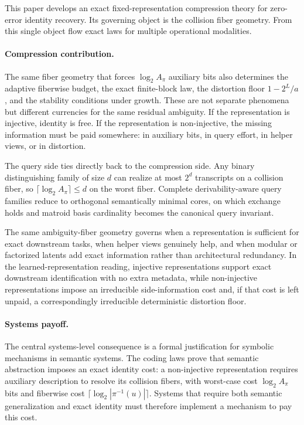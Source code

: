 This paper develops an exact fixed-representation compression theory for zero-error identity recovery. Its governing object is the collision fiber geometry. From this single object flow exact laws for multiple operational modalities.

\paragraph{Compression contribution.}
The same fiber geometry that forces $\log_2 A_\pi$ auxiliary bits also determines the adaptive fiberwise budget, the exact finite-block law, the distortion floor $1-2^L/a$, and the stability conditions under growth. These are not separate phenomena but different currencies for the same residual ambiguity. If the representation is injective, identity is free. If the representation is non-injective, the missing information must be paid somewhere: in auxiliary bits, in query effort, in helper views, or in distortion.

The query side ties directly back to the compression side. Any binary distinguishing family of size $d$ can realize at most $2^d$ transcripts on a collision fiber, so $\lceil \log_2 A_\pi \rceil \le d$ on the worst fiber. Complete derivability-aware query families reduce to orthogonal semantically minimal cores, on which exchange holds and matroid basis cardinality becomes the canonical query invariant.

The same ambiguity-fiber geometry governs when a representation is sufficient for exact downstream tasks, when helper views genuinely help, and when modular or factorized latents add exact information rather than architectural redundancy. In the learned-representation reading, injective representations support exact downstream identification with no extra metadata, while non-injective representations impose an irreducible side-information cost and, if that cost is left unpaid, a correspondingly irreducible deterministic distortion floor.

\paragraph{Systems payoff.}
The central systems-level consequence is a formal justification for symbolic mechanisms in semantic systems. The coding laws prove that semantic abstraction imposes an exact identity cost: a non-injective representation requires auxiliary description to resolve its collision fibers, with worst-case cost $\log_2 A_\pi$ bits and fiberwise cost $\lceil \log_2 |\pi^{-1}(u)| \rceil$. Systems that require both semantic generalization and exact identity must therefore implement a mechanism to pay this cost.

